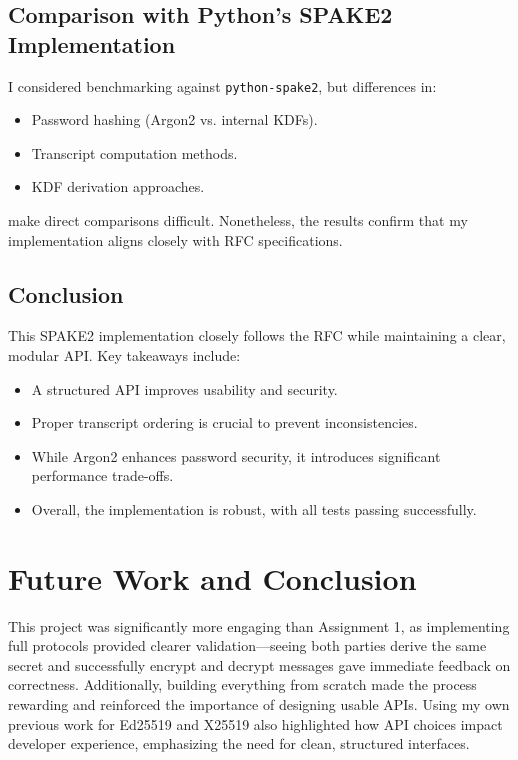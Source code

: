 \documentclass[twoside,a4paper,12pt]{article}
\begin{document}
\subsection{Comparison with Python's SPAKE2 Implementation}
\label{subsec:spake2_comparison}
    
I considered benchmarking against \texttt{python-spake2}, but differences in:
    
\begin{itemize}
    \item Password hashing (Argon2 vs. internal KDFs).
    \item Transcript computation methods.
    \item KDF derivation approaches.
\end{itemize}
    
make direct comparisons difficult. Nonetheless, the results confirm that my implementation aligns closely with RFC specifications.
    
\subsection{Conclusion}
\label{subsec:spake2_conclusion}    
This SPAKE2 implementation closely follows the RFC while maintaining a clear, modular API. Key takeaways include:
\begin{itemize}
    \item A structured API improves usability and security.
    \item Proper transcript ordering is crucial to prevent inconsistencies.
    \item While Argon2 enhances password security, it introduces significant performance trade-offs.
    \item Overall, the implementation is robust, with all tests passing successfully.
\end{itemize}
    
\section{Future Work and Conclusion}
\label{sec:future}

This project was significantly more engaging than Assignment 1, as implementing full protocols provided clearer validation—seeing both parties derive the same secret and successfully encrypt and decrypt messages gave immediate feedback on correctness. Additionally, building everything from scratch made the process rewarding and reinforced the importance of designing usable APIs. Using my own previous work for Ed25519 and X25519 also highlighted how API choices impact developer experience, emphasizing the need for clean, structured interfaces.
\end{document}
